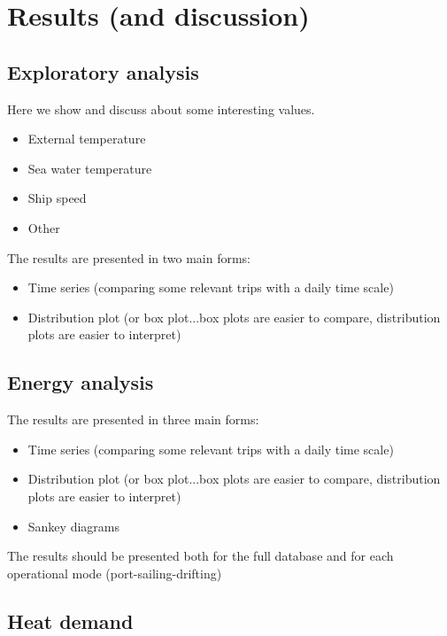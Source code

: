 \documentclass[preprint,12pt]{elsarticle}
\begin{document}
\section{Results (and discussion)}

\subsection{Exploratory analysis} \label{sec:res:exploratory}

Here we show and discuss about some interesting values. 
\begin{itemize}
	\item External temperature
	\item Sea water temperature
	\item Ship speed
	\item Other
\end{itemize}

The results are presented in two main forms:
\begin{itemize}
	\item Time series (comparing some relevant trips with a daily time scale)
	\item Distribution plot (or box plot...box plots are easier to compare, distribution plots are easier to interpret)
\end{itemize}

\subsection{Energy analysis} \label{sec:res:energy}

The results are presented in three main forms:
\begin{itemize}
	\item Time series (comparing some relevant trips with a daily time scale)
	\item Distribution plot (or box plot...box plots are easier to compare, distribution plots are easier to interpret)
	\item Sankey diagrams
\end{itemize}

The results should be presented both for the full database and for each operational mode (port-sailing-drifting)

\subsection{Heat demand} \label{sec:res:heat}
\end{document}

